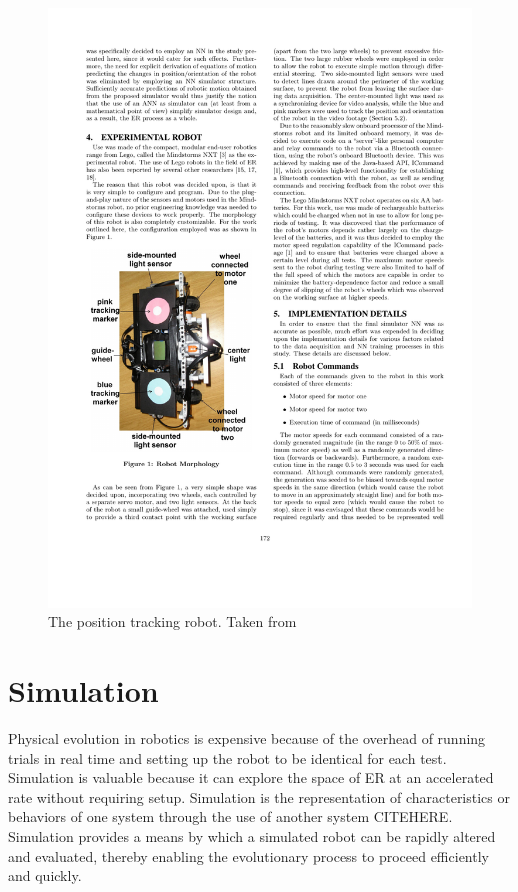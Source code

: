 \documentclass{sig-alternate}
\begin{document}
\begin{figure}%
  \includegraphics[scale=.8]{cr1}
\caption{The position tracking robot. Taken from ~\cite{Pretorius:2009:TAN:1632149.1632171}}
\label{fig:pRobot}
\end{figure}
	
\section{Simulation}\label{simulation}
Physical evolution in robotics is expensive because of the overhead of running trials in real time and setting up the robot to be identical for each test. Simulation is valuable because it can explore the space of ER at an accelerated rate without requiring setup. Simulation is the representation of characteristics or behaviors of one system through the use of another system CITEHERE. Simulation provides a means by which a simulated robot can be rapidly altered and evaluated, thereby enabling the evolutionary process to proceed efficiently and quickly.
\end{document}
